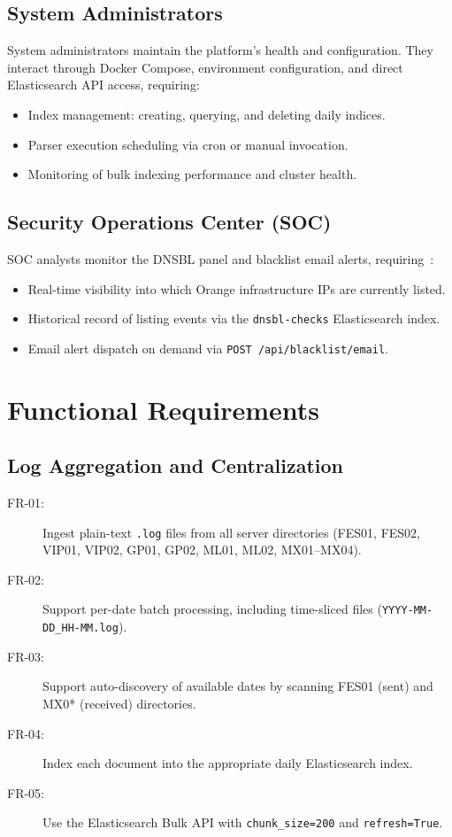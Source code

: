 \documentclass[12pt,a4paper,oneside]{report}
\begin{document}
\subsection{System Administrators}

System administrators maintain the platform's health and configuration.
They interact through Docker Compose, environment configuration, and direct Elasticsearch API access, requiring:
\begin{itemize}
  \item Index management: creating, querying, and deleting daily indices.
  \item Parser execution scheduling via cron or manual invocation.
  \item Monitoring of bulk indexing performance and cluster health.
\end{itemize}

\subsection{Security Operations Center (SOC)}

SOC analysts monitor the DNSBL panel and blacklist email alerts, requiring~\cite{owaspAuth}:
\begin{itemize}
  \item Real-time visibility into which Orange infrastructure IPs are currently listed.
  \item Historical record of listing events via the \texttt{dnsbl-checks} Elasticsearch index.
  \item Email alert dispatch on demand via \texttt{POST /api/blacklist/email}.
\end{itemize}

\section{Functional Requirements}

\subsection{Log Aggregation and Centralization}

\begin{description}
  \item[FR-01:] Ingest plain-text \texttt{.log} files from all server directories (FES01, FES02, VIP01, VIP02, GP01, GP02, ML01, ML02, MX01--MX04).
  \item[FR-02:] Support per-date batch processing, including time-sliced files (\texttt{YYYY-MM-DD\_HH-MM.log}).
  \item[FR-03:] Support auto-discovery of available dates by scanning FES01 (sent) and MX0* (received) directories.
  \item[FR-04:] Index each document into the appropriate daily Elasticsearch index.
  \item[FR-05:] Use the Elasticsearch Bulk API with \texttt{chunk\_size=200} and \texttt{refresh=True}.
\end{description}
\end{document}
